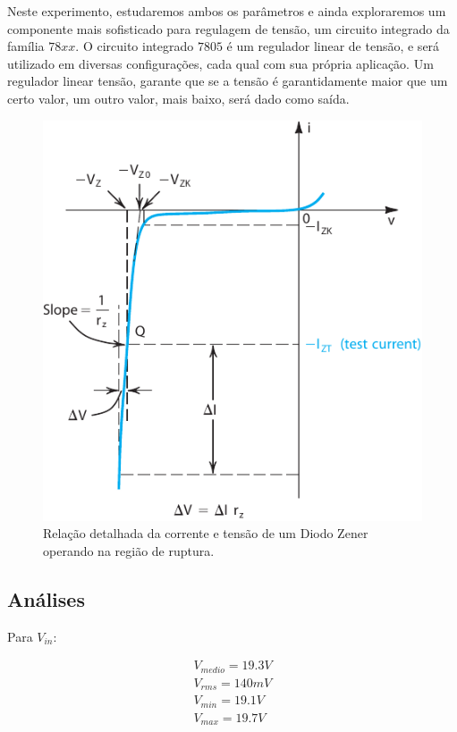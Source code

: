 \documentclass[12pt,a4paper]{article}
\begin{document}
Neste experimento, estudaremos ambos os parâmetros e ainda exploraremos um componente mais sofisticado para regulagem de tensão, um circuito integrado da família $78xx$. O circuito integrado $7805$ é um regulador linear de tensão, e será utilizado em diversas configurações, cada qual com sua própria aplicação. Um regulador linear tensão, garante que se a tensão é garantidamente maior que um certo valor, um outro valor, mais baixo, será dado como saída.

\begin{figure}[htpb]
  \centering
  \includegraphics[width=0.6\linewidth]{breakdown_region.pdf}
  \caption{Relação detalhada da corrente e tensão de um Diodo Zener operando na região de ruptura.}
  \label{fig:breakdown}
\end{figure}

\newpage
\subsection{Análises}
Para $V_{in}$:

\begin{align*}
V_{medio} = 19.3 V \\
V_{rms} = 140 mV \\
V_{min} = 19.1 V \\
V_{max} = 19.7 V 
\end{align*}
\end{document}
